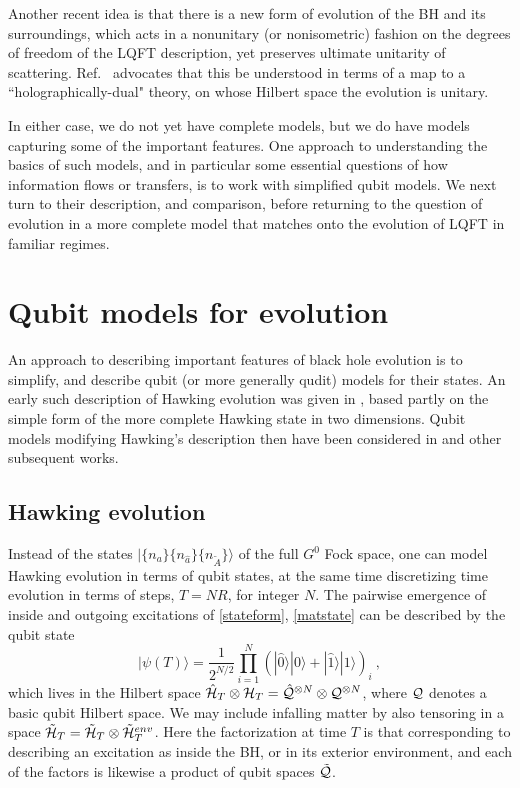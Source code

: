 \documentclass[11pt]{article}
\numberwithin{equation}{section}
\newcommand{\calh}{{\cal H}}
\newcommand{\calq}{{\cal Q}}
\newcommand{\beq}{\begin{equation}}
\newcommand{\eeq}{\end{equation}}
\begin{document}
Another recent idea\cite{AEHPV} is that there is a new form of evolution of the BH and its surroundings, which acts in a nonunitary (or nonisometric) fashion on the degrees of freedom of the LQFT description, yet preserves ultimate unitarity of scattering.  Ref.~\cite{AEHPV} advocates that this be understood in terms of a map to a ``holographically-dual" theory, on whose Hilbert space the evolution is unitary.  

In either case, we do not yet have complete models, but we do have models capturing some of the important features.  One approach to understanding the basics of such models, and in particular some essential questions of how information flows or transfers, is to work with simplified qubit models.  We next turn to their description, and comparison, before returning to the question of evolution in a more complete model that matches onto the evolution of LQFT in familiar regimes.


\section{Qubit models for evolution}

An approach to describing important features of black hole evolution is to simplify, and describe qubit (or more generally qudit) models for their states. An early such description of Hawking evolution was given in \cite{Mathinforev}, based partly on the simple form of the more complete Hawking state in two dimensions\cite{GiNe}.  Qubit models modifying Hawking's description then have been considered in \cite{Mathinforev,SGmodels,BHQIUE,GiShone} and other subsequent works.

\subsection{Hawking evolution}

Instead of the states $|{\{n_a\}\{n_{\hat a}\}\{n_{\tilde A}\}}\rangle$ of the full $G^0$ Fock space, one can model Hawking evolution in terms of qubit states, at the same time discretizing time evolution in terms of steps, $T=NR$, for integer $N$.  The pairwise emergence of inside and outgoing excitations of  \eqref{stateform}, \eqref{matstate} can be described by the qubit state
\beq\label{HawkQ}
|\psi(T)\rangle = \frac{1}{2^{N/2}}\prod_{i=1}^N \left(|\hat 0\rangle |0\rangle + |\hat 1\rangle |1\rangle\right)_i\ ,
\eeq
which lives in the Hilbert space $\hat\calh_T\otimes \calh_T=\hat \calq^{\otimes N}\otimes \calq^{\otimes N}$, where $\calq$ denotes a basic qubit Hilbert space.  We may include infalling matter by also tensoring in a space $\tilde \calh_T =  \tilde \calh_T \otimes \tilde \calh^{env}_T$.  Here the factorization at time $T$ is that corresponding to describing an excitation as inside the BH, or in its exterior environment, and each of the factors is likewise a product of qubit spaces $\tilde \calq$.  
\end{document}
